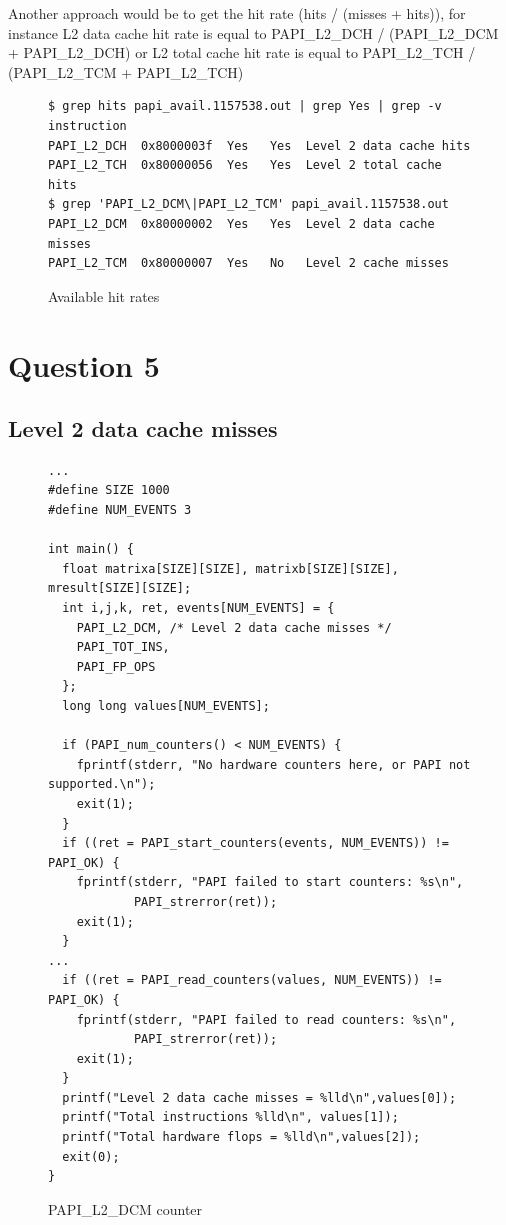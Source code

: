 \documentclass[12pt]{article}
\begin{document}
Another approach would be to get the hit rate (hits / (misses + hits)), for instance L2 data cache hit rate is equal to PAPI\_L2\_DCH / (PAPI\_L2\_DCM + PAPI\_L2\_DCH) or L2 total cache hit rate is equal to PAPI\_L2\_TCH / (PAPI\_L2\_TCM + PAPI\_L2\_TCH)

\begin{figure}[h!]
	\begin{verbatim}
$ grep hits papi_avail.1157538.out | grep Yes | grep -v instruction
PAPI_L2_DCH  0x8000003f  Yes   Yes  Level 2 data cache hits
PAPI_L2_TCH  0x80000056  Yes   Yes  Level 2 total cache hits
$ grep 'PAPI_L2_DCM\|PAPI_L2_TCM' papi_avail.1157538.out
PAPI_L2_DCM  0x80000002  Yes   Yes  Level 2 data cache misses
PAPI_L2_TCM  0x80000007  Yes   No   Level 2 cache misses
	\end{verbatim}
	\caption{Available hit rates}\label{code:qflow}
\end{figure}

\newpage

\section*{Question 5}

\subsection*{Level 2 data cache misses}

\begin{figure}[h!]
	\begin{verbatim}
...
#define SIZE 1000
#define NUM_EVENTS 3

int main() {
  float matrixa[SIZE][SIZE], matrixb[SIZE][SIZE], mresult[SIZE][SIZE];
  int i,j,k, ret, events[NUM_EVENTS] = {
    PAPI_L2_DCM, /* Level 2 data cache misses */
    PAPI_TOT_INS,
    PAPI_FP_OPS
  };
  long long values[NUM_EVENTS];

  if (PAPI_num_counters() < NUM_EVENTS) {
    fprintf(stderr, "No hardware counters here, or PAPI not supported.\n");
    exit(1);
  }
  if ((ret = PAPI_start_counters(events, NUM_EVENTS)) != PAPI_OK) {
    fprintf(stderr, "PAPI failed to start counters: %s\n",
  	        PAPI_strerror(ret));
  	exit(1);
  }
...
  if ((ret = PAPI_read_counters(values, NUM_EVENTS)) != PAPI_OK) {
    fprintf(stderr, "PAPI failed to read counters: %s\n",
            PAPI_strerror(ret));
  	exit(1);
  }
  printf("Level 2 data cache misses = %lld\n",values[0]);
  printf("Total instructions %lld\n", values[1]);
  printf("Total hardware flops = %lld\n",values[2]);
  exit(0);
}
	\end{verbatim}
	\caption{PAPI\_L2\_DCM counter}\label{code:l2dcm}
\end{figure}
\end{document}
